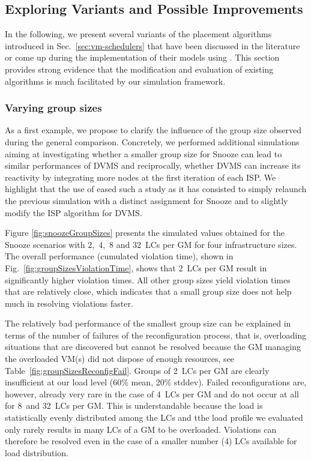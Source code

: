 \subsection{Exploring Variants and Possible Improvements}
\label{subsec:variant}

In the following, we present several variants of
the placement algorithms introduced in Sec.~\ref{sec:vm-schedulers}
that have been discussed in the literature or come up during the
implementation of their models using \vmps. This section provides
strong evidence that the modification and evaluation of existing
algorithms is much facilitated by our simulation framework.

\subsubsection{Varying group sizes}
\label{sec:groupSizes}

As a first example, we propose to clarify the influence of the group
size observed during the general comparison.
Concretely, we performed additional simulations aiming at
investigating whether a smaller group size for Snooze can lead to similar
performances of DVMS and reciprocally, whether DVMS can increase its
reactivity by integrating more nodes at the first iteration of each
ISP. We highlight that the use of \vmps eased such a study as it has consisted
to simply relaunch the previous simulation with a distinct
assignment for Snooze and to slightly modify the ISP algorithm for DVMS.


Figure \ref{fig:snoozeGroupSizes} presents the simulated values
obtained for the Snooze scenarios with 2,~4,~8 and 32~LCs per GM for four
infrastructure sizes. The overall performance (\ie cumulated violation
time), shown in Fig.~\ref{fig:groupSizesViolationTime}, shows that
2~LCs per GM result in significantly higher violation times. All other
group sizes yield violation times that are relatively close, which
indicates that a small group size does not help much in
resolving violations faster.

The relatively bad performance of the smallest group size can be
explained in terms of the number of failures of the reconfiguration
process, that is, overloading situations that are discovered but
cannot be resolved because the GM managing the overloaded VM(s) did
not dispose of enough resources, see
Table~\ref{fig:groupSizesReconfigFail}. Groups of 2~LCs per GM are
clearly insufficient at our load level (60\% mean, 20\% stddev).
Failed reconfigurations are, however, already very rare in the case of
4~LCs per GM and do not occur at all for 8~and 32~LCs per GM. This is
understandable because the load is statistically evenly distributed
among the LCs and tthe load profile we evaluated only rarely results
in many LCs of a GM to be overloaded. Violations can therefore be
resolved even in the case of a smaller number (4) LCs available for
load distribution.

